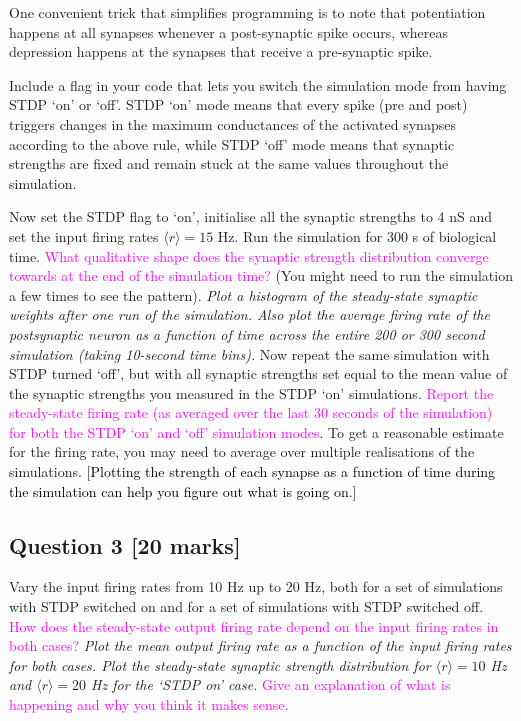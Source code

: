 \documentclass[12pt]{article}
\begin{document}
One convenient trick that simplifies programming is to note that potentiation happens at all synapses whenever a post-synaptic spike occurs, whereas depression happens at the synapses that receive a pre-synaptic spike.

Include a flag in your code that lets you switch the simulation mode
from having STDP `on' or `off'. STDP `on' mode means that every
spike (pre and post) triggers changes in the maximum conductances
of the activated synapses according to the above rule, while STDP
`off' mode means that synaptic strengths are fixed and remain stuck
at the same values throughout the simulation.


Now set the STDP flag to `on', initialise all the synaptic strengths to 4 nS and set the input firing rates $\langle r\rangle=15$
Hz. Run the simulation for 300 s of biological time. \textcolor{magenta}{What qualitative shape does the synaptic strength distribution converge towards at the end of the simulation time?} (You might need to run the simulation a few times to see the pattern).
\emph{Plot a histogram of the steady-state synaptic weights after
one run of the simulation. Also plot the average firing rate of the
postsynaptic neuron as a function of time across the entire 200 or
300 second simulation (taking 10-second time bins).}
Now repeat the same simulation with STDP turned `off', but with all synaptic strengths
set equal to the mean value of the synaptic strengths you measured
in the STDP `on' simulations. \textcolor{magenta}{Report the steady-state
firing rate (as averaged over the last 30 seconds of the simulation)
for both the STDP `on' and `off' simulation modes}. To get a reasonable
estimate for the firing rate, you may need to average over multiple
realisations of the simulations. \textcolor{black}{{[}Plotting the
 strength of each synapse as a function of time during the simulation
can help you figure out what is going on.{]}}

\subsection*{Question 3 [20 marks]} Vary the input firing rates from 10 Hz up to 20 Hz,
both for a set of simulations with STDP switched on and for a set
of simulations with STDP switched off. \textcolor{magenta}{How does
the steady-state output firing rate depend on the input firing rates
in both cases?} \emph{Plot the mean output firing rate as a function
of the input firing rates for both cases. Plot the steady-state synaptic strength
distribution for $\langle r\rangle=10$ Hz and $\langle r\rangle=20$
Hz for the `STDP on' case.} \textcolor{magenta}{Give an explanation of what is happening and why you think it makes sense.}
\end{document}
